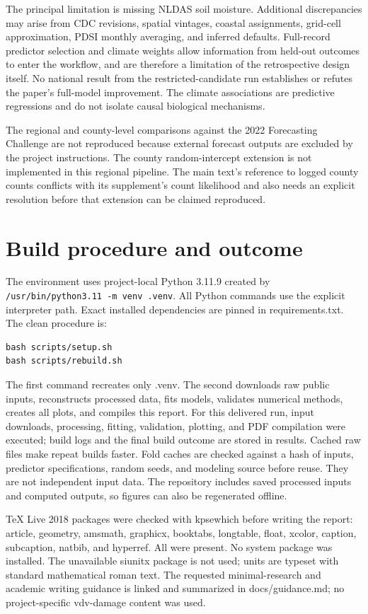 \documentclass[11pt]{article}
\begin{document}
The principal limitation is missing NLDAS soil moisture. Additional discrepancies
may arise from CDC revisions, spatial vintages, coastal assignments, grid-cell
approximation, PDSI monthly averaging, and inferred defaults. Full-record predictor
selection and climate weights allow information from held-out outcomes to enter
the workflow, and are therefore a limitation of the retrospective design itself.
No national result from the restricted-candidate run establishes or refutes the
paper's full-model improvement. The climate associations are predictive regressions
and do not isolate causal biological mechanisms.

The regional and county-level comparisons against the 2022 Forecasting Challenge
are not reproduced because external forecast outputs are excluded by the project
instructions. The county random-intercept extension is not implemented in this
regional pipeline. The main text's reference to logged county counts conflicts
with its supplement's count likelihood and also needs an explicit resolution
before that extension can be claimed reproduced.

\section{Build procedure and outcome}
The environment uses project-local Python 3.11.9 created by
\texttt{/usr/bin/python3.11 -m venv .venv}. All Python commands use the explicit
interpreter path. Exact installed dependencies are pinned in requirements.txt.
The clean procedure is:
\begin{verbatim}
bash scripts/setup.sh
bash scripts/rebuild.sh
\end{verbatim}
The first command recreates only .venv. The second downloads raw public inputs,
reconstructs processed data, fits models, validates numerical methods, creates all
plots, and compiles this report. For this delivered run, input downloads, processing,
fitting, validation, plotting, and PDF compilation were executed; build logs and
the final build outcome are stored in results. Cached raw files make repeat builds
faster. Fold caches are checked against a hash of inputs, predictor specifications,
random seeds, and modeling source before reuse. They are not independent input data.
The repository includes saved
processed inputs and computed outputs, so figures can also be regenerated offline.

TeX Live 2018 packages were checked with kpsewhich before writing the report:
article, geometry, amsmath, graphicx, booktabs, longtable, float, xcolor, caption,
subcaption, natbib, and hyperref. All were present. No system package was installed.
The unavailable siunitx package is not used; units are typeset with standard
mathematical roman text. The requested minimal-research and academic writing
guidance is linked and summarized in docs/guidance.md; no project-specific
vdv-damage content was used.
\end{document}
